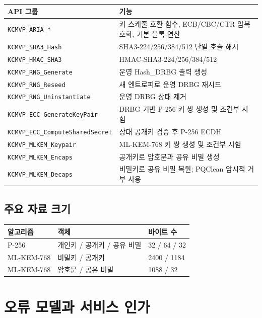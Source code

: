 \documentclass[11pt,a4paper]{article}
\begin{document}
\begin{longtable}{p{}p{}}
\toprule
API 그룹 & 기능 \\
\midrule
\endhead
\texttt{KCMVP\_ARIA\_*} & 키 스케줄 호환 함수, ECB/CBC/CTR 암복호화, 기본 블록 연산 \\
\texttt{KCMVP\_SHA3\_Hash} & SHA3-224/256/384/512 단일 호출 해시 \\
\texttt{KCMVP\_HMAC\_SHA3} & HMAC-SHA3-224/256/384/512 \\
\texttt{KCMVP\_RNG\_Generate} & 운영 Hash\_DRBG 출력 생성 \\
\texttt{KCMVP\_RNG\_Reseed} & 새 엔트로피로 운영 DRBG 재시드 \\
\texttt{KCMVP\_RNG\_Uninstantiate} & 운영 DRBG 상태 제거 \\
\texttt{KCMVP\_ECC\_GenerateKeyPair} & DRBG 기반 P-256 키 쌍 생성 및 조건부 시험 \\
\texttt{KCMVP\_ECC\_ComputeSharedSecret} & 상대 공개키 검증 후 P-256 ECDH \\
\texttt{KCMVP\_MLKEM\_Keypair} & ML-KEM-768 키 쌍 생성 및 조건부 시험 \\
\texttt{KCMVP\_MLKEM\_Encaps} & 공개키로 암호문과 공유 비밀 생성 \\
\texttt{KCMVP\_MLKEM\_Decaps} & 비밀키로 공유 비밀 복원; PQClean 암시적 거부 사용 \\
\bottomrule
\end{longtable}

\subsection{주요 자료 크기}

\begin{center}
\begin{tabular}{lll}
\toprule
알고리즘 & 객체 & 바이트 수 \\
\midrule
P-256 & 개인키 / 공개키 / 공유 비밀 & 32 / 64 / 32 \\
ML-KEM-768 & 비밀키 / 공개키 & 2400 / 1184 \\
ML-KEM-768 & 암호문 / 공유 비밀 & 1088 / 32 \\
\bottomrule
\end{tabular}
\end{center}

\section{오류 모델과 서비스 인가}
\end{document}
